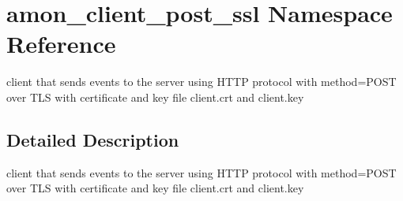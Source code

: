 \hypertarget{namespaceamon__client__post__ssl}{\section{amon\-\_\-client\-\_\-post\-\_\-ssl Namespace Reference}
\label{namespaceamon__client__post__ssl}
}


client that sends events to the server using H\-T\-T\-P protocol with method=P\-O\-S\-T over T\-L\-S with certificate and key file client.\-crt and client.\-key  




\subsection{Detailed Description}
client that sends events to the server using H\-T\-T\-P protocol with method=P\-O\-S\-T over T\-L\-S with certificate and key file client.\-crt and client.\-key 